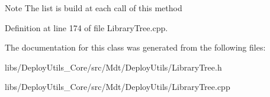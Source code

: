 \begin{DoxyNote}{Note}
The list is build at each call of this method 
\end{DoxyNote}


Definition at line 174 of file Library\+Tree.\+cpp.



The documentation for this class was generated from the following files\+:\begin{DoxyCompactItemize}
\item 
libs/\+Deploy\+Utils\+\_\+\+Core/src/\+Mdt/\+Deploy\+Utils/Library\+Tree.\+h\item 
libs/\+Deploy\+Utils\+\_\+\+Core/src/\+Mdt/\+Deploy\+Utils/Library\+Tree.\+cpp\end{DoxyCompactItemize}
